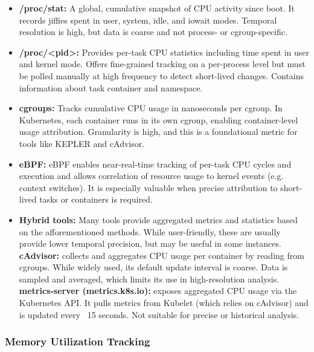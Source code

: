 \begin{itemize}
    \item \textbf{/proc/stat:} A global, cumulative snapshot of CPU activity since boot. It records jiffies spent in user, system, idle, and iowait modes. Temporal resolution is high, but data is coarse and not process- or cgroup-specific.
    \item \textbf{/proc/\textless pid\textgreater :} Provides per-task CPU statistics including time spent in user and kernel mode. Offers fine-grained tracking on a per-process level but must be polled manually at high frequency to detect short-lived changes. Contains information about task container and namespace.
    \item \textbf{cgroups:} Tracks cumulative CPU usage in nanoseconds per cgroup. In Kubernetes, each container runs in its own cgroup, enabling container-level usage attribution. Granularity is high, and this is a foundational metric for tools like KEPLER and cAdvisor.
    \item \textbf{eBPF:} eBPF enables near-real-time tracking of per-task CPU cycles and execution and allows correlation of resource usage to kernel events (e.g. context switches). It is especially valuable when precise attribution to short-lived tasks or containers is required.
    \item \textbf{Hybrid tools:} Many tools provide aggregated metrics and statistics based on the afforementioned methods. While user-friendly, these are usually provide lower temporal precision, but may be useful in some instances. \textbf{cAdvisor:} collects and aggregates CPU usage per container by reading from cgroups. While widely used, its default update interval is coarse. Data is sampled and averaged, which limits its use in high-resolution analysis. \textbf{metrics-server (metrics.k8s.io):} exposes aggregated CPU usage via the Kubernetes API. It pulls metrics from Kubelet (which relies on cAdvisor) and is updated every ~15 seconds. Not suitable for precise or historical analysis.
\end{itemize}

\subsubsection*{Memory Utilization Tracking}

